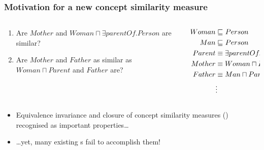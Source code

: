\documentclass[smaller]{beamer}
\begin{document}
\begin{frame}
  \frametitle{Motivation for a new concept similarity measure}
  
  \begin{columns}
    \begin{column}{0.55\textwidth}
      \begin{enumerate}[<+->]
        \item Are \(Mother\) and
        \(Woman \sqcap \exists{}parentOf.Person\) are similar?
        \item Are \(Mother\) and \(Father\) as similar
        as \(Woman \sqcap Parent\) and \(Father\) are?
      \end{enumerate}
    \end{column}
    \begin{column}{0.45\textwidth}
        \begin{align*}
          Woman &\sqsubseteq_{\mathcal{}} Person \\
          Man &\sqsubseteq_{\mathcal{}} Person \\
          Parent &\equiv \exists{}parentOf.Person \\
          Mother &\equiv Woman \sqcap Parent \\
          Father &\equiv Man \sqcap Parent \\
          &\vdots
        \end{align*}
    \end{column}
  \end{columns}
  \begin{itemize}[<+->]
    \item Equivalence \alert{invariance} and \alert{closure}
    of concept similarity measures (\csm)
    recognised as important properties\ldots
    \item \ldots yet, many existing
    \csm{}s fail to accomplish them!
  \end{itemize}
\end{frame}
\end{document}
